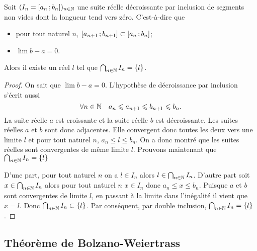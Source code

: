 \begin{theo}
  Soit \((I_n=\left[ a_n \, ;  b_n \right])_{n \in \mathbb{N}}\) une suite réelle décroissante par inclusion de segments non vides dont la longueur tend vers zéro. C'est-à-dire que
  \begin{itemize}
  \item pour tout naturel \(n\), \(\left[ a_{n+1} \, ;  b_{n+1} \right] \subset \left[ a_{n} \, ;  b_{n} \right]\);
  \item \(\lim b-a =0\).
  \end{itemize}
Alors il existe un réel \(l\) tel que \(\bigcap_{n \in \mathbb{N}} I_n = \{l\}\).
\end{theo}
\begin{proof}
  On sait que \(\lim b-a = 0\). L'hypothèse de décroissance par inclusion s'écrit aussi
  \begin{equation}
    \forall n \in \mathbb{N} \quad a_n \leqslant a_{n+1} \leqslant b_{n+1} \leqslant b_n.
  \end{equation}
La suite réelle \(a\) est croissante et la suite réelle \(b\) est décroissante. Les suites réelles \(a\) et \(b\) sont donc adjacentes. Elle convergent donc toutes les deux vers une limite \(l\) et pour tout naturel \(n\), \(a_n \leqslant l \leqslant b_n\). On a donc montré que les suites réelles sont convergentes de même limite \(l\). Prouvons maintenant que \(\bigcap_{n \in \mathbb{N}} I_n = \{l\}\)

D'une part, pour tout naturel \(n\) on a \(l \in I_n\) alors \(l \in \bigcap_{n \in \mathbb{N}} I_n\). D'autre part soit \(x \in \bigcap_{n \in \mathbb{N}} I_n\) alors pour tout naturel \(n\) \(x \in I_n\) donc \(a_n \leqslant x \leqslant b_n\). Puisque \(a\) et \(b\) sont convergentes de limite \(l\), en passant à la limite dans l'inégalité il vient que \(x=l\). Donc \(\bigcap_{n \in \mathbb{N}} I_n \subset \{l\}\). Par conséquent, par double inclusion, \(\bigcap_{n \in \mathbb{N}} I_n = \{l\}\).
\end{proof}

\subsection{Théorème de Bolzano-Weiertrass}

